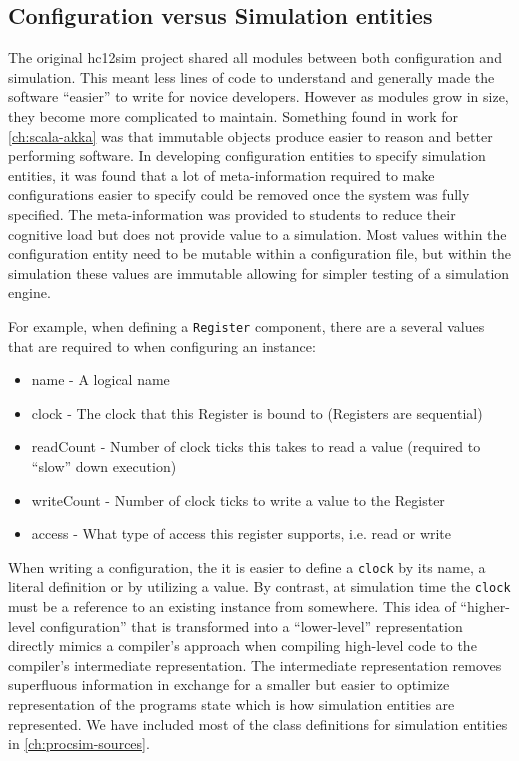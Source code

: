 \subsection{Configuration versus Simulation entities}
\label{sec:lua:sec:configuration-vs-simulation}

The original hc12sim project shared all modules between both configuration and simulation. This meant less lines of code to understand and generally made the software ``easier'' to write for novice developers. However as modules grow in size, they become more complicated to maintain. Something found in work for \cref{ch:scala-akka} was that immutable objects produce easier to reason and better performing software. In developing configuration entities to specify simulation entities, it was found that a lot of meta-information required to make configurations easier to specify could be removed once the system was fully specified. The meta-information was provided to students to reduce their cognitive load but does not provide value to a simulation. Most values within the configuration entity need to be mutable within a configuration file, but within the simulation these values are immutable allowing for simpler testing of a simulation engine.

For example, when defining a \texttt{Register} component, there are a several values that are required to when configuring an instance: 
\begin{itemize}
\item name - A logical name
\item clock - The clock that this Register is bound to (Registers are sequential)
\item readCount - Number of clock ticks this takes to read a value (required to ``slow'' down execution)
\item writeCount - Number of clock ticks to write a value to the Register
\item access - What type of access this register supports, i.e. read or write
\end{itemize}
When writing a configuration, the it is easier to define a \texttt{clock} by its name, a literal definition or by utilizing a  value. By contrast, at simulation time the \texttt{clock} must be a reference to an existing instance from somewhere. This idea of ``higher-level configuration'' that is transformed into a ``lower-level'' representation directly mimics a compiler's approach when compiling high-level code to the compiler's intermediate representation. The intermediate representation removes superfluous information in exchange for a smaller but easier to optimize representation of the programs state which is how simulation entities are represented. We have included most of the class definitions for simulation entities in \cref{ch:procsim-sources}.

